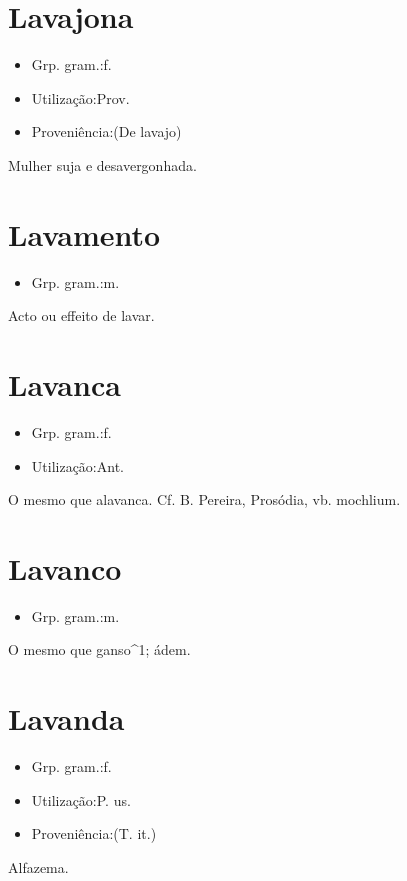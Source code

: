 \section{Lavajona}
\begin{itemize}
\item {Grp. gram.:f.}
\end{itemize}
\begin{itemize}
\item {Utilização:Prov.}
\end{itemize}
\begin{itemize}
\item {Proveniência:(De \textunderscore lavajo\textunderscore )}
\end{itemize}
Mulher suja e desavergonhada.
\section{Lavamento}
\begin{itemize}
\item {Grp. gram.:m.}
\end{itemize}
Acto ou effeito de lavar.
\section{Lavanca}
\begin{itemize}
\item {Grp. gram.:f.}
\end{itemize}
\begin{itemize}
\item {Utilização:Ant.}
\end{itemize}
O mesmo que \textunderscore alavanca\textunderscore . Cf. B. Pereira, \textunderscore Prosódia\textunderscore , vb. \textunderscore mochlium\textunderscore .
\section{Lavanco}
\begin{itemize}
\item {Grp. gram.:m.}
\end{itemize}
O mesmo que \textunderscore ganso\textunderscore ^1; ádem.
\section{Lavanda}
\begin{itemize}
\item {Grp. gram.:f.}
\end{itemize}
\begin{itemize}
\item {Utilização:P. us.}
\end{itemize}
\begin{itemize}
\item {Proveniência:(T. it.)}
\end{itemize}
Alfazema.
